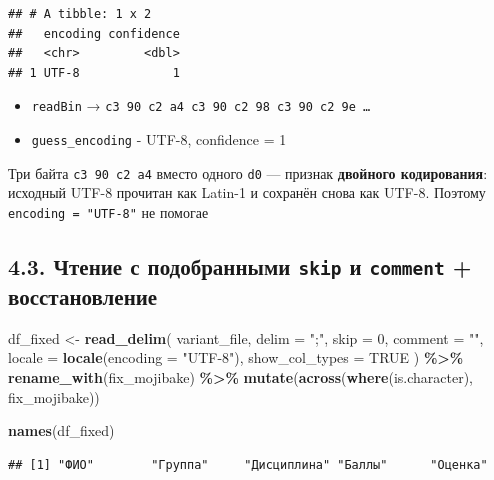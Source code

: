 \documentclass[
]{article}
\newenvironment{Shaded}{\begin{snugshade}}{\end{snugshade}}
\newcommand{\AttributeTok}[1]{\textcolor[rgb]{0.13,0.29,0.53}{#1}}
\newcommand{\ConstantTok}[1]{\textcolor[rgb]{0.56,0.35,0.01}{#1}}
\newcommand{\DecValTok}[1]{\textcolor[rgb]{0.00,0.00,0.81}{#1}}
\newcommand{\FunctionTok}[1]{\textcolor[rgb]{0.13,0.29,0.53}{\textbf{#1}}}
\newcommand{\NormalTok}[1]{#1}
\newcommand{\OtherTok}[1]{\textcolor[rgb]{0.56,0.35,0.01}{#1}}
\newcommand{\SpecialCharTok}[1]{\textcolor[rgb]{0.81,0.36,0.00}{\textbf{#1}}}
\newcommand{\StringTok}[1]{\textcolor[rgb]{0.31,0.60,0.02}{#1}}
\providecommand{\tightlist}{%
  \setlength{\itemsep}{0pt}\setlength{\parskip}{0pt}}
\begin{document}
\begin{verbatim}
## # A tibble: 1 x 2
##   encoding confidence
##   <chr>         <dbl>
## 1 UTF-8             1
\end{verbatim}

\begin{itemize}
\tightlist
\item
  \texttt{readBin} →
  \texttt{c3\ 90\ c2\ a4\ c3\ 90\ c2\ 98\ c3\ 90\ c2\ 9e\ …}
\item
  \texttt{guess\_encoding} - UTF-8, confidence = 1
\end{itemize}

Три байта \texttt{c3\ 90\ c2\ a4} вместо одного \texttt{d0} --- признак
\textbf{двойного кодирования}: исходный UTF-8 прочитан как Latin-1 и
сохранён снова как UTF-8. Поэтому \texttt{encoding\ =\ "UTF-8"} не
помогае

\subsection{\texorpdfstring{4.3. Чтение с подобранными \texttt{skip} и
\texttt{comment} +
восстановление}{4.3. Чтение с подобранными skip и comment + восстановление}}\label{ux447ux442ux435ux43dux438ux435-ux441-ux43fux43eux434ux43eux431ux440ux430ux43dux43dux44bux43cux438-skip-ux438-comment-ux432ux43eux441ux441ux442ux430ux43dux43eux432ux43bux435ux43dux438ux435}

\begin{Shaded}
\begin{Highlighting}[]
\NormalTok{df\_fixed }\OtherTok{\textless{}{-}} \FunctionTok{read\_delim}\NormalTok{(}
\NormalTok{  variant\_file,}
  \AttributeTok{delim          =} \StringTok{";"}\NormalTok{,}
  \AttributeTok{skip           =} \DecValTok{0}\NormalTok{,}
  \AttributeTok{comment        =} \StringTok{""}\NormalTok{,}
  \AttributeTok{locale         =} \FunctionTok{locale}\NormalTok{(}\AttributeTok{encoding =} \StringTok{"UTF{-}8"}\NormalTok{),}
  \AttributeTok{show\_col\_types =} \ConstantTok{TRUE}
\NormalTok{) }\SpecialCharTok{\%\textgreater{}\%}
  \FunctionTok{rename\_with}\NormalTok{(fix\_mojibake) }\SpecialCharTok{\%\textgreater{}\%}
  \FunctionTok{mutate}\NormalTok{(}\FunctionTok{across}\NormalTok{(}\FunctionTok{where}\NormalTok{(is.character), fix\_mojibake))}

\FunctionTok{names}\NormalTok{(df\_fixed)}
\end{Highlighting}
\end{Shaded}

\begin{verbatim}
## [1] "ФИО"        "Группа"     "Дисциплина" "Баллы"      "Оценка"
\end{verbatim}
\end{document}

